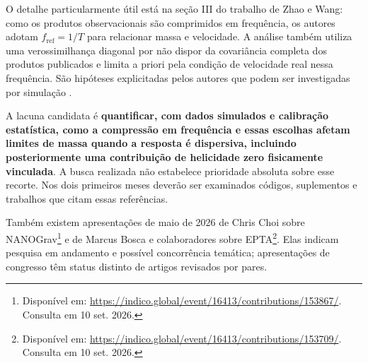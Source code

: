 O detalhe particularmente útil está na seção III do trabalho de Zhao e
Wang: como os produtos observacionais são comprimidos em frequência, os
autores adotam \(f_{\mathrm{ref}}=1/T\) para relacionar massa e
velocidade. A análise também utiliza uma verossimilhança diagonal por
não dispor da covariância completa dos produtos publicados e limita a
priori pela condição de velocidade real nessa frequência. São hipóteses
explicitadas pelos autores que podem ser investigadas por simulação \autocite{zhao2026}.

A lacuna candidata é \textbf{quantificar, com dados simulados e
calibração estatística, como a compressão em frequência e essas escolhas
afetam limites de massa quando a resposta é dispersiva, incluindo
posteriormente uma contribuição de helicidade zero fisicamente
vinculada}. A busca realizada não estabelece prioridade absoluta sobre
esse recorte. Nos dois primeiros meses deverão ser examinados códigos,
suplementos e trabalhos que citam essas referências.

Também existem apresentações de maio de 2026 de Chris Choi sobre
NANOGrav\footnote{Disponível em:
  \url{https://indico.global/event/16413/contributions/153867/}.
  Consulta em 10 set. 2026.} e de Marcus Bosca e colaboradores sobre
EPTA\footnote{Disponível em:
  \url{https://indico.global/event/16413/contributions/153709/}.
  Consulta em 10 set. 2026.}. Elas indicam pesquisa em andamento e
possível concorrência temática; apresentações de congresso têm status
distinto de artigos revisados por pares.
